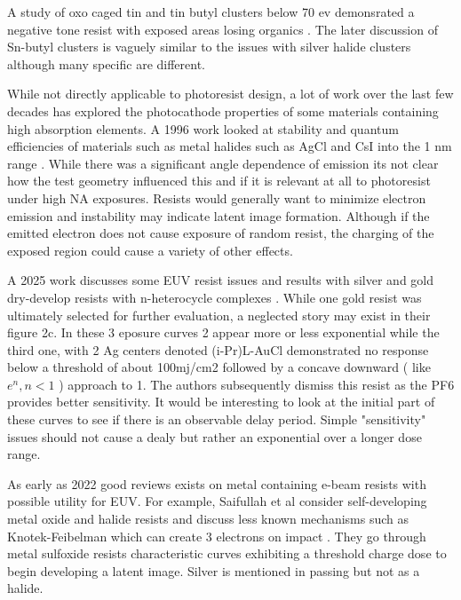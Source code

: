 A study of oxo caged tin and tin butyl clusters below 70 ev
demonsrated a negative tone resist with exposed areas losing
organics \cite{PMC10926160}. The later discussion of Sn-butyl
clusters is vaguely similar to the issues with silver halide
clusters although many specific are different. 

While not directly applicable to photoresist design, a lot 
of work over the last few decades
 has explored the photocathode properties of some 
materials containing high absorption elements.
A 1996 work looked at stability and quantum efficiencies
of materials such as metal halides such as AgCl and CsI
into the 1 nm range
\cite{OswaldHWSiegmundfirstMarkAGummin_title_Progress_1996}.
While there was a significant angle dependence of emission
its not clear how the test geometry influenced this and
if it is relevant at all to photoresist under high NA exposures.
Resists would generally want to minimize electron emission
and instability may indicate latent image formation.
Although if the emitted electron does not cause exposure
of random resist, the charging of the exposed region could
cause a variety of other effects. 




A 2025 work discusses some EUV resist issues and results with silver
and gold dry-develop resists with n-heterocycle complexes
\cite{https://doi.org/10.1002/smll.202407966}. While one gold resist
was ultimately selected for further evaluation, a neglected story
may exist in their figure 2c. In these 3 eposure curves 2 appear
more or less exponential while the third one, with 2 Ag centers
denoted (i-Pr)L-AuCl demonstrated no response below a threshold of 
about 100mj/cm2 followed by a concave downward ( like $e^n, n<1$ ) 
approach to 1. The authors subsequently dismiss this resist as the
PF6 provides better sensitivity. It would be interesting to look at
the initial part of these curves to see if there is an observable
delay period. Simple "sensitivity" issues should not cause
a dealy but rather an exponential over a longer dose range.


As early as 2022 good reviews exists on metal containing
e-beam resists with possible utility for EUV. For example,
Saifullah et al consider self-developing metal oxide and halide
resists and discuss less known mechanisms such as Knotek-Feibelman
which can create 3 electrons on impact
\cite{Saifullah_Tiwale_Ganesan_Review_metal_containing_2022}.
They go through metal sulfoxide resists characteristic curves
exhibiting a threshold charge dose to begin developing a latent image.
Silver is mentioned in passing but not as a halide.


